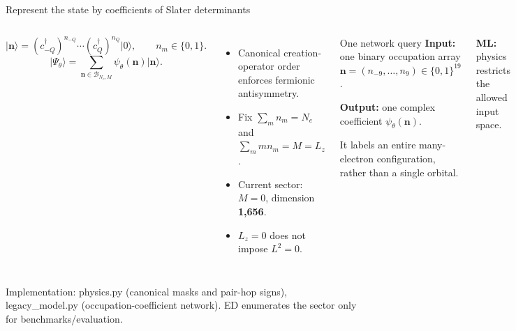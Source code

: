 \documentclass[aspectratio=169,10pt]{beamer}
\newcommand{\src}[1]{\vfill{\fontsize{6.3}{7.5}\selectfont\color{muted}#1\par}}
\newcommand{\ml}[1]{{\color{teal}\textbf{ML:} #1}}
\newcommand{\ket}[1]{\lvert #1\rangle}
\newcommand{\nn}{\mathbf n}
\begin{document}
\begin{frame}{Represent the state by coefficients of Slater determinants}
\begin{columns}[T,onlytextwidth]
\[
\ket{\nn}=(c^\dagger_{-Q})^{n_{-Q}}\cdots(c^\dagger_Q)^{n_Q}\ket0,
\qquad n_m\in\{0,1\}.
\]
\[
\ket{\Psi_\theta}=\sum_{\nn\in\mathcal B_{N_e,M}}\psi_\theta(\nn)\ket{\nn}.
\]
\begin{itemize}\setlength\itemsep{5pt}
\item Canonical creation-operator order enforces fermionic antisymmetry.
\item Fix $\sum_m n_m=N_e$ and $\sum_m m n_m=M=L_z$.
\item Current sector: $M=0$, dimension \textbf{1,656}.
\item $L_z=0$ does not impose $L^2=0$.
\end{itemize}
\begin{block}{One network query}
\small
\textbf{Input:} one binary occupation array\\
$\nn=(n_{-9},\ldots,n_9)\in\{0,1\}^{19}$.\par\medskip
\textbf{Output:} one complex coefficient $\psi_\theta(\nn)$.\par\medskip
It labels an entire many-electron configuration, rather than a single orbital.
\end{block}
\ml{physics restricts the allowed input space.}
\end{columns}
\src{Implementation: physics.py (canonical masks and pair-hop signs), legacy\_model.py (occupation-coefficient network). ED enumerates the sector only for benchmarks/evaluation.}
\end{frame}
\end{document}

